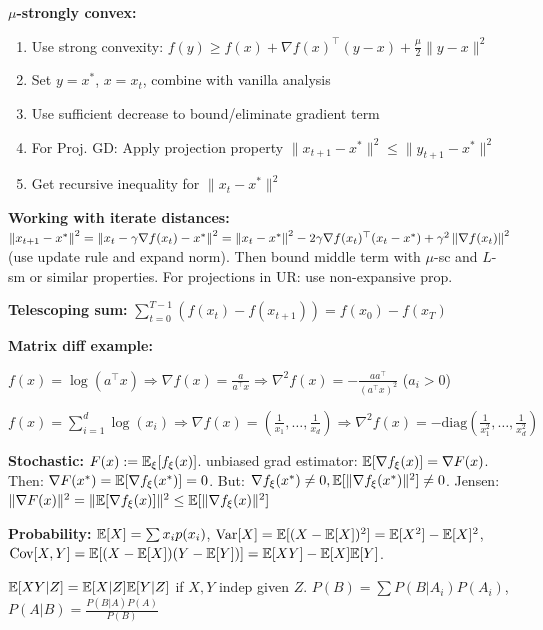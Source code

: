 \textbf{$\mu$-strongly convex:}
\begin{enumerate}
\item Use strong convexity: $f(y) \geq f(x) + \nabla f(x)^\top (y-x) + \frac{\mu}{2}\lVert y-x \rVert^2$
\item Set $y=x^*$, $x=x_t$, combine with vanilla analysis
\item Use sufficient decrease to bound/eliminate gradient term
\item For Proj. GD: Apply projection property $\lVert x_{t+1} - x^* \rVert^2 \leq \lVert y_{t+1} - x^* \rVert^2$
\item Get recursive inequality for $\lVert x_t - x^* \rVert^2$
\end{enumerate}

\textbf{Working with iterate distances:} $\left\lVert x_{t+1} - x^* \right\rVert^2 = \left\lVert x_t - \gamma \nabla f(x_t) - x^* \right\rVert^2 = \left\lVert x_t - x^* \right\rVert^2 - 2\gamma \nabla f(x_t)^\top (x_t - x^*) + \gamma^2 \left\lVert \nabla f(x_t) \right\rVert^2$ (use update rule and expand norm). Then bound middle term with $\mu$-sc and $L$-sm or similar properties. For projections in UR: use non-expansive prop.

\textbf{Telescoping sum:} $\sum_{t=0}^{T-1} (f(x_t) - f(x_{t+1})) = f(x_0) - f(x_T)$


\textbf{Matrix diff example:} 

$f(x) = \log(a^\top x) \Rightarrow \nabla f(x) = \frac{a}{a^\top x} \Rightarrow \nabla^2 f(x) = -\frac{aa^\top}{(a^\top x)^2}$ ($a_i > 0$)

$f(x) = \sum_{i=1}^d \log(x_i) \Rightarrow \nabla f(x) = ( \frac{1}{x_1}, \ldots, \frac{1}{x_d} ) \Rightarrow \nabla^2 f(x) = -\text{diag}(\frac{1}{x_1^2}, \ldots, \frac{1}{x_d^2})$

\textbf{Stochastic: } $F(x) := \mathbb{E}_\xi [f_\xi(x)]$. unbiased grad estimator: $\mathbb{E}[\nabla f_\xi(x)] = \nabla F(x)$. Then: $\nabla F(x^*) = \mathbb{E}[\nabla f_\xi(x^*)] = 0$. But: $\nabla f_\xi(x^*) \neq 0, \mathbb{E}[\Vert \nabla f_\xi(x^*) \Vert^2] \neq 0$. Jensen: $\Vert \nabla F(x) \Vert^2 = \Vert \mathbb{E}[\nabla f_\xi(x)] \Vert^2 \leq \mathbb{E}[\Vert \nabla f_\xi(x) \Vert^2]$

\textbf{Probability: } $\mathbb{E}[X] = \sum x_i p(x_i)$, $\text{Var}[X] = \mathbb{E}[(X-\mathbb{E}[X])^2] = \mathbb{E}[X^2] - \mathbb{E}[X]^2$, $\text{Cov}[X,Y] = \mathbb{E}[(X-\mathbb{E}[X])(Y-\mathbb{E}[Y])] = \mathbb{E}[XY] - \mathbb{E}[X]\mathbb{E}[Y]$. 

$\mathbb{E}[XY|Z] = \mathbb{E}[X|Z] \mathbb{E}[Y|Z]$ if $X, Y$ indep given $Z$. $P(B) = \sum P(B|A_i)P(A_i)$, $P(A|B) = \frac{P(B|A)P(A)}{P(B)}$

